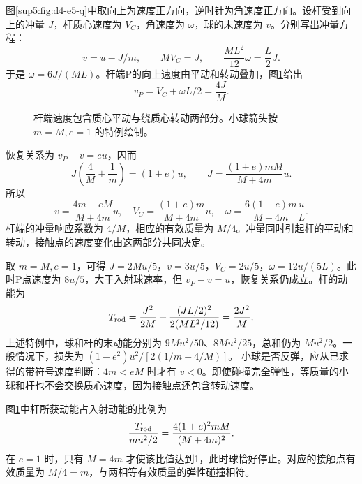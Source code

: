 \begin{solution}
图\ref{sup5:fig:d4-e5-q}中取向上为速度正方向，逆时针为角速度正方向。设杆受到向上的冲量 $J$，杆质心速度为 $V_C$，角速度为 $\omega$，球的末速度为 $v$。分别写出冲量方程：
\begin{equation}
 v=u-J/m,\qquad MV_C=J,\qquad
 \frac{ML^2}{12}\omega=\frac L2J.
\end{equation}
于是 $\omega=6J/(ML)$。杆端P的向上速度由平动和转动叠加，图\ref{sup5:fig:d4-e5-s}给出
\begin{equation}
 v_P=V_C+\omega L/2=\frac{4J}{M}.
\end{equation}
\begin{figure}[H]\centering
{}
\caption{杆端速度包含质心平动与绕质心转动两部分。小球箭头按 $m=M,e=1$ 的特例绘制。}\label{sup5:fig:d4-e5-s}
\end{figure}
恢复关系为 $v_P-v=eu$，因而
\begin{equation}
 J\left(\frac4M+\frac1m\right)=(1+e)u,
 \qquad J=\frac{(1+e)mM}{M+4m}u.
\end{equation}
所以
\begin{equation}
 v=\frac{4m-eM}{M+4m}u,\quad
 V_C=\frac{(1+e)m}{M+4m}u,\quad
 \omega=\frac{6(1+e)m}{M+4m}\frac uL.
\end{equation}
杆端的冲量响应系数为 $4/M$，相应的有效质量为 $M/4$。冲量同时引起杆的平动和转动，接触点的速度变化由这两部分共同决定。

取 $m=M,e=1$，可得 $J=2Mu/5$，$v=3u/5$，$V_C=2u/5$，$\omega=12u/(5L)$。此时P点速度为 $8u/5$，大于入射球速率，但 $v_P-v=u$，恢复关系仍成立。杆的动能为
\begin{equation}
 T_{\rm rod}=\frac{J^2}{2M}+\frac{(JL/2)^2}{2(ML^2/12)}
 =\frac{2J^2}{M}.
\end{equation}
上述特例中，球和杆的末动能分别为 $9Mu^2/50$、$8Mu^2/25$，总和仍为 $Mu^2/2$。一般情况下，损失为 $(1-e^2)u^2/[2(1/m+4/M)]$。
小球是否反弹，应从已求得的带符号速度判断：$4m<eM$ 时才有 $v<0$。即使碰撞完全弹性，等质量的小球和杆也不会交换质心速度，因为接触点还包含转动速度。

图\ref{sup5:fig:d4-e5-s}中杆所获动能占入射动能的比例为
\[
\frac{T_{\rm rod}}{mu^2/2}
=\frac{4(1+e)^2mM}{(M+4m)^2}.
\]
在 $e=1$ 时，只有 $M=4m$ 才使该比值达到1，此时球恰好停止。对应的接触点有效质量为 $M/4=m$，与两相等有效质量的弹性碰撞相符。

\end{solution}



